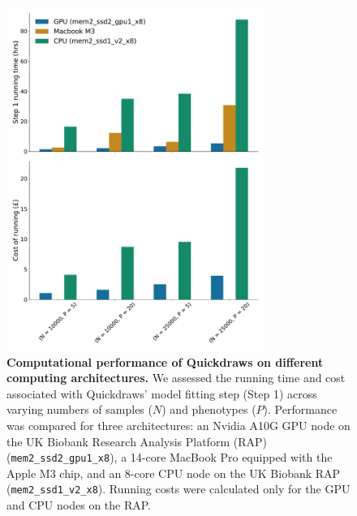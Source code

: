 \begin{figure}
    \centering
    \includegraphics[width=0.75\textwidth]{figures/step1_running_time_cost.pdf}
    \caption{\textbf{Computational performance of Quickdraws on different computing architectures.} We assessed the running time and cost associated with Quickdraws' model fitting step (Step 1) across varying numbers of samples ($N$) and phenotypes ($P$). Performance was compared for three architectures: an Nvidia A10G GPU node on the UK Biobank Research Analysis Platform (RAP) (\texttt{mem2\_ssd2\_gpu1\_x8}), a 14-core MacBook Pro equipped with the Apple M3 chip, and an 8-core CPU node on the UK Biobank RAP (\texttt{mem2\_ssd1\_v2\_x8}). Running costs were calculated only for the GPU and CPU nodes on the RAP.}
    \label{fig:cpu_vs_gpu_vs_mac}
\label{fig:step1_cpu_gpu}
\end{figure}